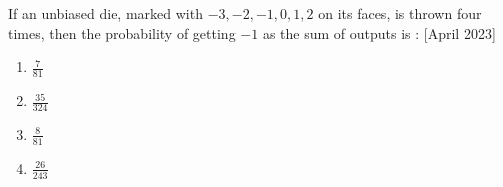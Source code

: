 \item If an unbiased die, marked with $-3,-2,-1,0,1,2$ on its faces, is thrown four times, then the probability of getting $-1$ as the sum of outputs is : \hfill{[April 2023]}
\begin{enumerate}
    \item $\frac{7}{81}$
    \item $\frac{35}{324}$
    \item $\frac{8}{81}$
    \item $\frac{26}{243}$
\end{enumerate}
